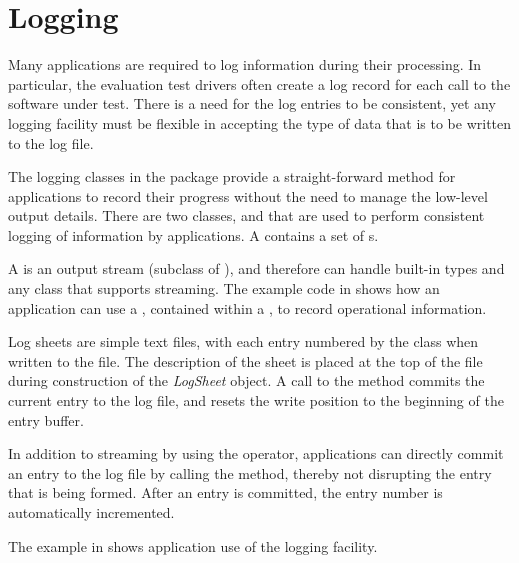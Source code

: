 \section{Logging}
\label{sec-logging}

Many applications are required to log information during their processing. In
particular, the evaluation test drivers often create a log record for each
call to the software under test. There is a need for the log entries to be
consistent, yet any logging facility must be flexible in accepting the type of
data that is to be written to the log file.

The logging classes in the  package provide a straight-forward method
for applications to record their progress without the need to manage the
low-level output details.
There are two classes,  and  that are used
to perform consistent logging of information by applications. A 
contains a set of s.

A  is an output stream (subclass of ),
and therefore can handle built-in types and any class that supports streaming.
The example code in  shows how an application can use a
, contained within a , to record operational
information.

Log sheets are simple text files, with each entry numbered by the 
class when written to the file. The description of the sheet is placed at the
top of the file during construction of the {\em LogSheet} object. A call to the
 method commits the current entry to the log file, and resets
the write position to the beginning of the entry buffer.

In addition to streaming by using the  operator, applications
can directly commit an entry to the log file by calling the 
method, thereby not disrupting the entry that is being formed. After an entry
is committed, the entry number is automatically incremented.

The example in  shows application use of the
logging facility.

